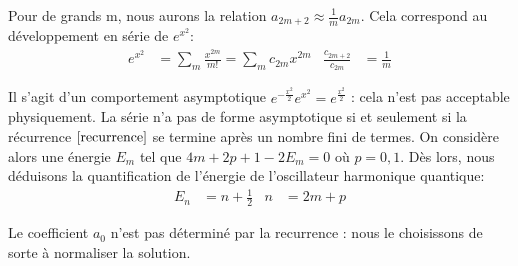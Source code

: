 \documentclass[../Notesdecours.tex]{subfiles}
\begin{document}
Pour de grands m, nous aurons la relation $a_{2m+2} \approx \frac{1}{m}a_{2m}$. Cela correspond au développement en série de $e^{x^2}$:
\begin{align}
    e^{x^2} &= \sum_m \frac{x^{2m}}{m!} = \sum_m c_{2m}x^{2m} & \frac{c_{2m+2}}{c_{2m}} &= \frac{1}{m}
\end{align}

Il s'agit d'un comportement asymptotique $e^{-\frac{x^2}{2}}e^{x^2} = e^{\frac{x^2}{2}}$ : cela n'est pas acceptable physiquement. La série n'a pas de forme asymptotique si et seulement si la récurrence $\eqref{recurrence}$ se termine après un nombre fini de termes. On considère alors une énergie $E_m$ tel que $4m+2p+1-2E_m = 0$ où $p = 0,1$. Dès lors, nous déduisons la quantification de l'énergie de l'oscillateur harmonique quantique:
\begin{align}
    E_n &= n+\frac{1}{2} & n &= 2m+p
\end{align}

\begin{remark}
    Le coefficient $a_0$ n'est pas déterminé par la recurrence : nous le choisissons de sorte à normaliser la solution.
\end{remark}
\end{document}
